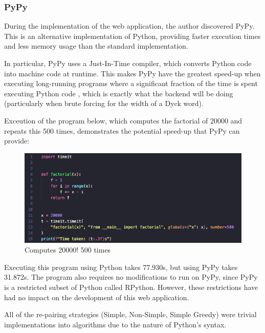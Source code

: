 \subsubsection{PyPy}
During the implementation of the web application, the author discovered PyPy. This is an alternative implementation of Python, providing faster execution times and less memory usage than the standard implementation.

\par\null\par
\noindent In particular, PyPy uses a Just-In-Time compiler, which converts Python code into machine code at runtime. This makes PyPy have the greatest speed-up when executing long-running programs where a significant fraction of the time is spent executing Python code \cite{whatisPyPy}, which is exactly what the backend will be doing (particularly when brute forcing for the width of a Dyck word). 

\par\null\par
\noindent Exceution of the program below, which computes the factorial of 20000 and repeats this 500 times, demonstrates the potential speed-up that PyPy can provide:

\begin{figure}[H]
    \centering
    \includegraphics[scale=0.55]{./images/factorialPyPy.png}
    \caption{Computes 20000! 500 times}
\end{figure}

\noindent Executing this program using Python takes 77.930s, but using PyPy takes 31.872s. The program also requires no modifications to run on PyPy, since PyPy is a restricted subset of Python called RPython. However, these restrictions have had no impact on the development of this web application.

\par\null\par
\noindent All of the re-pairing strategies (Simple, Non-Simple, Simple Greedy) were trivial implementations into algorithms due to the nature of Python's syntax.


